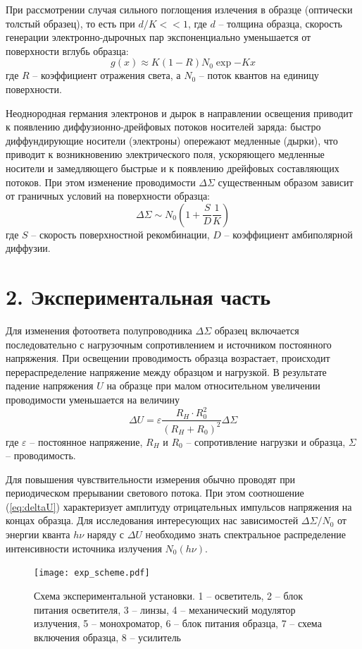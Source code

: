 \documentclass[a4paper,12pt]{report}
\begin{document}
    При рассмотрении случая сильного поглощения излечения в образце (оптически толстый образец), то есть при $d/K<<1$, где $d$ -- толщина образца, скорость генерации электронно-дырочных пар экспоненциально уменьшается от поверхности вглубь образца:
    \begin{equation}
        g(x)\approx K(1-R)N_0\exp{-Kx}
    \end{equation}
    где $R$ -- коэффициент отражения света, а $N_0$ -- поток квантов на единицу поверхности.

    Неоднородная германия электронов и дырок в направлении освещения приводит к появлению диффузионно-дрейфовых потоков носителей заряда: быстро диффундирующие носители (электроны) опережают медленные (дырки), что приводит к возникновению электрического поля, ускоряющего медленные носители и замедляющего быстрые и к появлению дрейфовых составляющих потоков. При этом изменение проводимости $\Delta\Sigma$ существенным образом зависит от граничных условий на поверхности образца:
    \begin{equation}
        \Delta\Sigma\sim N_0\left(1+\frac{S}{D}\frac{1}{K}\right)
    \end{equation}
    где $S$ -- скорость поверхностной рекомбинации, $D$ -- коэффициент амбиполярной диффузии.
    
    \section*{2. Экспериментальная часть}
    Для изменения фотоответа полупроводника $\Delta\Sigma$ образец включается последовательно с нагрузочным сопротивлением и источником постоянного напряжения. При освещении проводимость образца возрастает, происходит перераспределение напряжение между образцом и нагрузкой. В результате падение напряжения $U$ на образце при малом относительном увеличении проводимости уменьшается на величину
    \begin{equation}
        \Delta U=\varepsilon\frac{R_H\cdot R_0^2}{(R_H+R_0)^2}\Delta\Sigma
        \label{eq:deltaU}
    \end{equation}
    где $\varepsilon$ -- постоянное напряжение, $R_H$ и $R_0$ -- сопротивление нагрузки и образца, $\Sigma$ -- проводимость.

    Для повышения чувствительности измерения обычно проводят при периодическом прерывании светового потока. При этом соотношение (\ref{eq:deltaU}) характеризует амплитуду отрицательных импульсов напряжения на концах образца. Для исследования интересующих нас зависимостей $\Delta\Sigma/N_0$ от энергии кванта $h\nu$ наряду с $\Delta U$ необходимо знать спектральное распределение интенсивности источника излучения $N_0(h\nu)$.
    \begin{figure}[!htb]
        \centering
        \texttt{[image: exp\_scheme.pdf]}
        \caption{Схема экспериментальной установки. 1 -- осветитель, 2 -- блок питания осветителя, 3 -- линзы, 4 -- механический модулятор излучения, 5 -- монохроматор, 6 -- блок питания образца, 7 -- схема включения образца, 8 -- усилитель}
    \end{figure}
    
\end{document}

